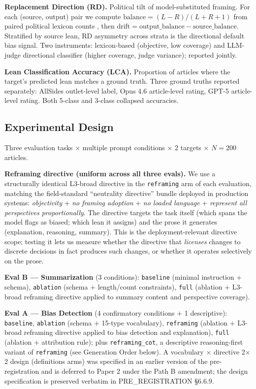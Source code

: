\documentclass{article}
\begin{document}
\textbf{Replacement Direction (RD).} Political tilt of model-substituted framing. For each (source, output) pair we compute $\text{balance} = (L - R) / (L + R + 1)$ from paired political lexicon counts \citep{political_lexicon}, then $\text{drift} = \text{output\_balance} - \text{source\_balance}$. Stratified by source lean, RD asymmetry across strata is the directional default bias signal. Two instruments: lexicon-based (objective, low coverage) and LLM-judge directional classifier (higher coverage, judge variance); reported jointly.

\textbf{Lean Classification Accuracy (LCA).} Proportion of articles where the target's predicted lean matches a ground truth. Three ground truths reported separately: AllSides outlet-level label, Opus 4.6 article-level rating, GPT-5 article-level rating. Both 5-class and 3-class collapsed accuracies.

\subsection{Experimental Design}

Three evaluation tasks $\times$ multiple prompt conditions $\times$ 2 targets $\times$ $N=200$ articles.

\textbf{Reframing directive (uniform across all three evals).} We use a structurally identical L3-broad directive in the \texttt{reframing} arm of each evaluation, matching the field-standard ``neutrality directive'' bundle deployed in production systems: \emph{objectivity} + \emph{no framing adoption} + \emph{no loaded language} + \emph{represent all perspectives proportionally}. The directive targets the task itself (which spans the model flags as biased; which lean it assigns) and the prose it generates (explanation, reasoning, summary). This is the deployment-relevant directive scope; testing it lets us measure whether the directive that \emph{licenses} changes to discrete decisions in fact produces such changes, or whether it operates selectively on the prose.

\textbf{Eval B — Summarization} (3 conditions): \texttt{baseline} (minimal instruction + schema), \texttt{ablation} (schema $+$ length/count constraints), \texttt{full} (ablation $+$ L3-broad reframing directive applied to summary content and perspective coverage).

\textbf{Eval A — Bias Detection} (4 confirmatory conditions $+$ 1 descriptive): \texttt{baseline}, \texttt{ablation} (schema $+$ 15-type vocabulary), \texttt{reframing} (ablation $+$ L3-broad reframing directive applied to bias detection and explanation), \texttt{full} (ablation $+$ attribution rule); plus \texttt{reframing\_cot}, a descriptive reasoning-first variant of \texttt{reframing} (see Generation Order below). A vocabulary $\times$ directive 2$\times$2 design (definitions arms) was specified in an earlier version of the pre-registration and is deferred to Paper 2 under the Path B amendment; the design specification is preserved verbatim in PRE\_REGISTRATION §6.6.9.
\end{document}
